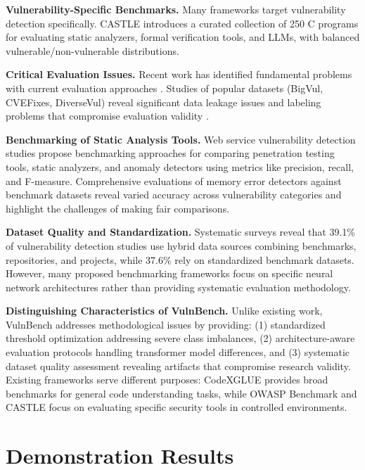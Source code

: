 \documentclass[letterpaper]{article}
\begin{document}
\textbf{Vulnerability-Specific Benchmarks.} Many frameworks target vulnerability detection specifically. CASTLE \citep{castle2025} introduces a curated collection of 250 C programs for evaluating static analyzers, formal verification tools, and LLMs, with balanced vulnerable/non-vulnerable distributions.

\textbf{Critical Evaluation Issues.} Recent work has identified fundamental problems with current evaluation approaches \citep{risse2025top}. Studies of popular datasets (BigVul, CVEFixes, DiverseVul) reveal significant data leakage issues and labeling problems that compromise evaluation validity \citep{ullah2024vulnerability}.

\textbf{Benchmarking of Static Analysis Tools.} Web service vulnerability detection studies \citep{antunes2010benchmarking} propose benchmarking approaches for comparing penetration testing tools, static analyzers, and anomaly detectors using metrics like precision, recall, and F-measure. Comprehensive evaluations of memory error detectors \citep{zhang2021evaluating} against benchmark datasets reveal varied accuracy across vulnerability categories and highlight the challenges of making fair comparisons.

\textbf{Dataset Quality and Standardization.} Systematic surveys \citep{systematic2024survey} reveal that 39.1\% of vulnerability detection studies use hybrid data sources combining benchmarks, repositories, and projects, while 37.6\% rely on standardized benchmark datasets. However, many proposed benchmarking frameworks \citep{lin2020deep} focus on specific neural network architectures rather than providing systematic evaluation methodology.

\textbf{Distinguishing Characteristics of VulnBench.} Unlike existing work, VulnBench addresses
methodological issues by providing: (1) standardized threshold optimization addressing severe class imbalances, (2) architecture-aware evaluation protocols handling transformer model differences, and (3) systematic dataset quality assessment revealing artifacts that compromise research validity. Existing frameworks serve different purposes: CodeXGLUE provides broad benchmarks for general code understanding tasks, while OWASP Benchmark and CASTLE focus on evaluating specific security tools in controlled environments.

\section{Demonstration Results}
\end{document}
